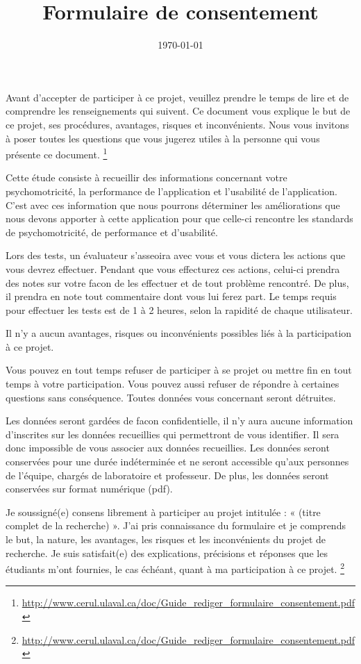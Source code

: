 \documentclass[12pt,a4paper,oneside]{article}
\begin{document}
\title{Formulaire de consentement}
\date{\today}
\maketitle

Avant d’accepter de participer à ce projet, veuillez prendre le temps de lire et de comprendre les renseignements qui suivent. Ce document vous explique le but de ce projet, ses procédures, avantages, risques et inconvénients. Nous vous invitons à poser toutes les questions que vous jugerez utiles à la personne qui vous présente ce document. \footnote{\url{http://www.cerul.ulaval.ca/doc/Guide_rediger_formulaire_consentement.pdf}}

Cette étude consiste à recueillir des informations concernant votre psychomotricité, la performance de l'application et l'usabilité de l'application. C'est avec ces information que nous pourrons déterminer les améliorations que nous devons apporter à cette application pour que celle-ci rencontre les standards de psychomotricité, de performance et d'usabilité.

Lors des tests, un évaluateur s'asseoira avec vous et vous dictera les actions que vous devrez effectuer. Pendant que vous effecturez ces actions, celui-ci prendra des notes sur votre facon de les effectuer et de tout problème rencontré. De plus, il prendra en note tout commentaire dont vous lui ferez part. Le temps requis pour effectuer les tests est de 1 à 2 heures, selon la rapidité de chaque utilisateur.

Il n'y a aucun avantages, risques ou inconvénients possibles liés à la participation à ce projet.

Vous pouvez en tout temps refuser de participer à se projet ou mettre fin en tout temps à votre participation. Vous pouvez aussi refuser de répondre à certaines questions sans conséquence. Toutes données vous concernant seront détruites.

Les données seront gardées de facon confidentielle, il n'y aura aucune information d'inscrites sur les données recueillies qui permettront de vous identifier. Il sera donc impossible de vous associer aux données recueillies. Les données seront conservées pour une durée indéterminée et ne seront accessible qu'aux personnes de l'équipe, chargés de laboratoire et professeur. De plus, les données seront conservées sur format numérique (pdf).

\newpage

Je soussigné(e) \underline{\hspace{4.5cm}} consens librement à participer au projet intitulée : « (titre complet de la recherche) ». J’ai pris connaissance du formulaire et je comprends le but, la nature, les avantages, les risques et les inconvénients du projet de recherche. Je suis satisfait(e) des explications, précisions et réponses que les étudiants m’ont fournies, le cas échéant, quant à ma participation à ce projet. \footnote{\url{http://www.cerul.ulaval.ca/doc/Guide_rediger_formulaire_consentement.pdf}}
\end{document}

